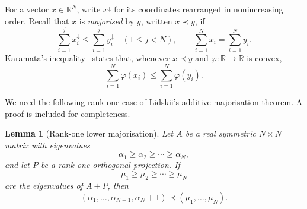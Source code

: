 \documentclass[11pt]{article}
\newtheorem{lemma}[theorem]{Lemma}
\theoremstyle{definition}
\theoremstyle{remark}
\newcommand{\R}{\mathbb{R}}
\begin{document}
For a vector $x\in\R^N$, write $x^\downarrow$ for its coordinates rearranged
in nonincreasing order.  Recall that $x$ is \emph{majorised} by $y$, written
$x\prec y$, if
\[
  \sum_{i=1}^j x_i^\downarrow
  \le
  \sum_{i=1}^j y_i^\downarrow
  \quad(1\le j<N),
  \qquad
  \sum_{i=1}^N x_i=\sum_{i=1}^N y_i.
\]
Karamata's inequality~\cite[Chapter~4]{MOA} states that, whenever $x\prec y$ and
$\varphi\colon\R\to\R$ is convex,
\begin{equation}
  \sum_{i=1}^N\varphi(x_i)
  \le
  \sum_{i=1}^N\varphi(y_i).
  \label{eq:karamata}
\end{equation}

We need the following rank-one case of Lidskii's additive majorisation
theorem.  A proof is included for completeness.

\begin{lemma}[Rank-one lower majorisation]
  \label{lem:rank-one-majorisation}
  Let $A$ be a real symmetric $N\times N$ matrix with eigenvalues
  \[
    \alpha_1\ge\alpha_2\ge\cdots\ge\alpha_N,
  \]
  and let $P$ be a rank-one orthogonal projection.  If
  \[
    \mu_1\ge\mu_2\ge\cdots\ge\mu_N
  \]
  are the eigenvalues of $A+P$, then
  \[
    (\alpha_1,\ldots,\alpha_{N-1},\alpha_N+1)
    \prec
    (\mu_1,\ldots,\mu_N).
  \]
\end{lemma}
\end{document}

